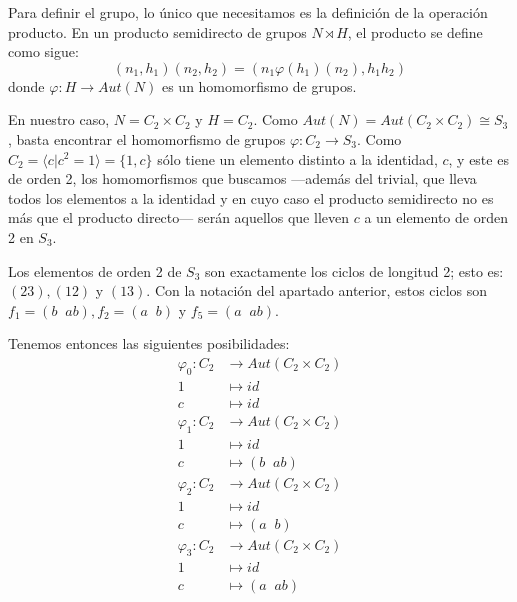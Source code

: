 \documentclass[a4paper, 11pt]{article}
\begin{document}
  \begin{solucion}
      Para definir el grupo, lo único que necesitamos es la definición de la operación producto. En un producto semidirecto de grupos $N \rtimes H$, el producto se define como sigue:
      \[
      (n_1,h_1)(n_2,h_2) = (n_1\varphi(h_1)(n_2),h_1 h_2)
      \]
      donde $\varphi: H \to Aut(N)$ es un homomorfismo de grupos.

      En nuestro caso, $N = C_2 \times C_2$ y $H = C_2$. Como $Aut(N) = Aut(C_2 \times C_2) \cong S_3$, basta encontrar el homomorfismo de grupos $\varphi: C_2 \to S_3$. Como $C_2=\langle c | c^2=1\rangle = \{ 1,c \}$ sólo tiene un elemento distinto a la identidad, $c$, y este es de orden 2, los homomorfismos que buscamos ---además del trivial, que lleva todos los elementos a la identidad y en cuyo caso el producto semidirecto no es más que el producto directo--- serán aquellos que lleven $c$ a un elemento de orden 2 en $S_3$.

      Los elementos de orden 2 de $S_3$ son exactamente los ciclos de longitud 2; esto es: $(23), (12)$ y $(13)$. Con la notación del apartado anterior, estos ciclos son $f_1=(b\;\;ab), f_2=(a\;\;b)$ y $f_5=(a\;\;ab)$.

      Tenemos entonces las siguientes posibilidades:
      \begin{align*}
          \varphi_0 : C_2 &\longrightarrow Aut(C_2 \times C_2) \\
          1 &\longmapsto id \\
          c &\longmapsto id
      \end{align*}
      \begin{align*}
          \varphi_1 : C_2 &\longrightarrow Aut(C_2 \times C_2) \\
          1 &\longmapsto id \\
          c &\longmapsto (b\;\;ab)
      \end{align*}
      \begin{align*}
          \varphi_2 : C_2 &\longrightarrow Aut(C_2 \times C_2) \\
          1 &\longmapsto id \\
          c &\longmapsto (a\;\;b)
      \end{align*}
      \begin{align*}
          \varphi_3 : C_2 &\longrightarrow Aut(C_2 \times C_2) \\
          1 &\longmapsto id \\
          c &\longmapsto (a\;\;ab)
      \end{align*}


\end{solucion}
\end{document}
